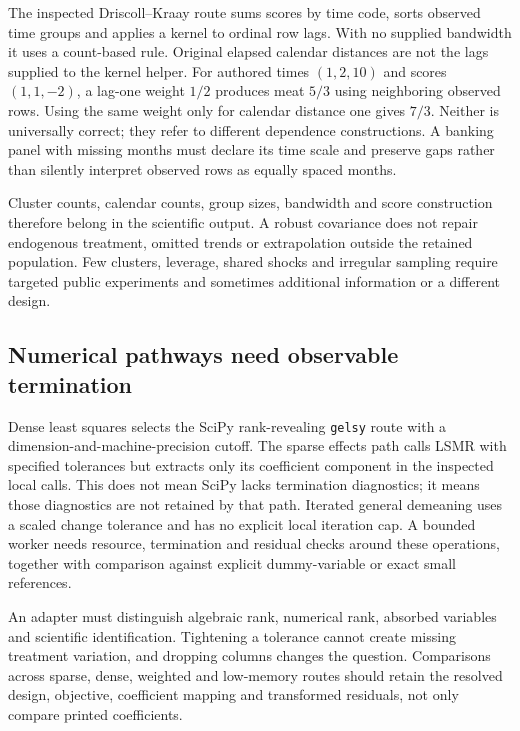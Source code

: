 The inspected Driscoll--Kraay route sums scores by time code, sorts observed
time groups and applies a kernel to ordinal row lags. With no supplied
bandwidth it uses a count-based rule. Original elapsed calendar distances
are not the lags supplied to the kernel helper. For authored times
$(1,2,10)$ and scores $(1,1,-2)$, a lag-one weight $1/2$ produces meat
$5/3$ using neighboring observed rows. Using the same weight only for
calendar distance one gives $7/3$. Neither is universally correct; they
refer to different dependence constructions. A banking panel with missing
months must declare its time scale and preserve gaps rather than silently
interpret observed rows as equally spaced months.
\citep{exec24_lmpanel_source,exec24_lmpanel_reference}

Cluster counts, calendar counts, group sizes, bandwidth and score construction
therefore belong in the scientific output. A robust covariance does not
repair endogenous treatment, omitted trends or extrapolation outside the
retained population. Few clusters, leverage, shared shocks and irregular
sampling require targeted public experiments and sometimes additional
information or a different design.\citep{exec24_lmpanel_reference}

\subsection{Numerical pathways need observable termination}
Dense least squares selects the SciPy rank-revealing \texttt{gelsy} route
with a dimension-and-machine-precision cutoff. The sparse effects path
calls LSMR with specified tolerances but extracts only its coefficient
component in the inspected local calls. This does not mean SciPy lacks
termination diagnostics; it means those diagnostics are not retained by
that path. Iterated general demeaning uses a scaled change tolerance and
has no explicit local iteration cap. A bounded worker needs resource,
termination and residual checks around these operations, together with
comparison against explicit dummy-variable or exact small references.
\citep{exec24_lmpanel_source}

An adapter must distinguish algebraic rank, numerical rank, absorbed
variables and scientific identification. Tightening a tolerance cannot
create missing treatment variation, and dropping columns changes the
question. Comparisons across sparse, dense, weighted and low-memory routes
should retain the resolved design, objective, coefficient mapping and
transformed residuals, not only compare printed coefficients.
\citep{exec24_lmpanel_reference}

